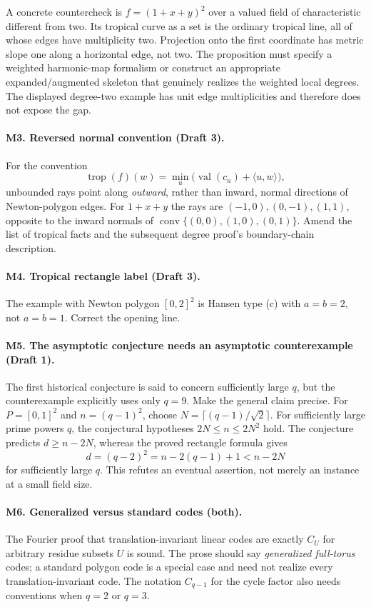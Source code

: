 \documentclass[12pt,letterpaper]{article}
\begin{document}
A concrete countercheck is \(f=(1+x+y)^2\) over a valued field of characteristic different from two. Its tropical curve as a set is the ordinary tropical line, all of whose edges have multiplicity two. Projection onto the first coordinate has metric slope one along a horizontal edge, not two. The proposition must specify a weighted harmonic-map formalism or construct an appropriate expanded/augmented skeleton that genuinely realizes the weighted local degrees. The displayed degree-two example has unit edge multiplicities and therefore does not expose the gap.

\paragraph{M3. Reversed normal convention (Draft 3).}
For the convention
\[
\operatorname{trop}(f)(w)=
 \min_u\bigl(\operatorname{val}(c_u)+\langle u,w\rangle\bigr),
\]
unbounded rays point along \emph{outward}, rather than inward, normal directions of Newton-polygon edges. For \(1+x+y\) the rays are
\((-1,0),(0,-1),(1,1)\), opposite to the inward normals of
\(\operatorname{conv}\{(0,0),(1,0),(0,1)\}\). Amend the list of tropical facts and the subsequent degree proof's boundary-chain description.

\paragraph{M4. Tropical rectangle label (Draft 3).}
The example with Newton polygon \([0,2]^2\) is Hansen type (c) with \(a=b=2\), not \(a=b=1\). Correct the opening line.

\paragraph{M5. The asymptotic conjecture needs an asymptotic counterexample (Draft 1).}
The first historical conjecture is said to concern sufficiently large \(q\), but the counterexample explicitly uses only \(q=9\). Make the general claim precise. For \(P=[0,1]^2\) and \(n=(q-1)^2\), choose
\(N=\lceil(q-1)/\sqrt2\rceil\).
For sufficiently large prime powers \(q\), the conjectural hypotheses
\(2N\le n\le2N^2\) hold. The conjecture predicts \(d\ge n-2N\), whereas the proved rectangle formula gives
\[
d=(q-2)^2=n-2(q-1)+1<n-2N
\]
for sufficiently large \(q\). This refutes an eventual assertion, not merely an instance at a small field size.

\paragraph{M6. Generalized versus standard codes (both).}
The Fourier proof that translation-invariant linear codes are exactly \(C_U\) for arbitrary residue subsets \(U\) is sound. The prose should say \emph{generalized full-torus} codes; a standard polygon code is a special case and need not realize every translation-invariant code. The notation \(C_{q-1}\) for the cycle factor also needs conventions when \(q=2\) or \(q=3\).
\end{document}
